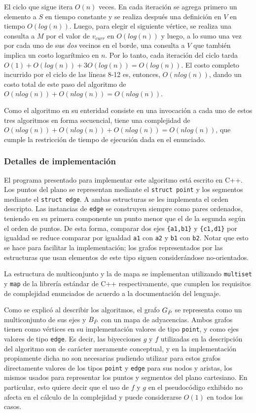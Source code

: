 El ciclo que sigue itera $O(n)$ veces. En cada iteración se agrega primero un elemento a $S$ en tiempo constante y se realiza después una definición en $V$ en tiempo $O(log(n))$. Luego, para elegir el siguiente vértice, se realiza una consulta a $M$ por el valor de $v_{\mathit{curr}}$ en $O(log(n))$ y luego, a lo sumo una vez por cada uno de sus \textit{dos} vecinos en el borde, una consulta a $V$ que también implica un costo logarítmico en $n$. Por lo tanto, cada iteración del ciclo tarda $O(1) + O(log(n)) + 3O(log(n)) = O(log(n))$. El costo completo incurrido por el ciclo de las líneas 8-12 es, entonces, $O(nlog(n))$, dando un costo total de este paso del algoritmo de $O(n log(n)) + O(n log(n)) = O(nlog(n))$.

\medskip

Como el algoritmo en su enteridad consiste en una invocación a cada uno de estos tres algoritmos en forma secuencial, tiene una complejidad de $O(n log(n)) + O(n log(n)) + O(n log(n)) = O(n log(n))$, que cumple la restricción de tiempo de ejecución dada en el enunciado.

\subsubsection{Detalles de implementación}

El programa presentado para implementar este algoritmo está escrito en C++. Los puntos del plano se representan mediante el \texttt{struct point} y los segmentos mediante el \texttt{struct edge}. A ambas estructuras se les implementa el orden descripto. Las instancias de \texttt{edge} se construyen siempre como pares ordenados, teniendo en su primera componente un punto menor que el de la segunda según el orden de puntos. De esta forma, comparar dos ejes \texttt{\{a1,b1\}} y \texttt{\{c1,d1\}} por igualdad se reduce comparar por igualdad \texttt{a1} con \texttt{a2} y \texttt{b1} con \texttt{b2}. Notar que esto se hace para facilitar la implementación; los grafos representados por las estructuras que usan elementos de este tipo siguen considerándose no-orientados.

La estructura de multiconjunto y la de mapa se implementan utilizando \texttt{multiset} y \texttt{map} de la librería estándar de C++ respectivamente, que cumplen los requisitos de complejidad enunciados de acuerdo a la documentación del lenguaje.

Como se explicó al describir los algoritmos, el grafo $G_{\bar{P}}$ se representa como un multiconjunto de sus ejes y $B_{\bar{P}}$ con un mapa de adyacencias. Ambos grafos tienen como vértices en su implementación valores de tipo \texttt{point}, y como ejes valores de tipo \texttt{edge}. Es decir, las biyecciones $g$ y $f$ utilizadas en la descripción del algoritmo son de carácter meramente conceptual, y en la implementación propiamente dicha no son necesarias pudiendo utilizar para estos grafos directamente valores de los tipos \texttt{point} y \texttt{edge} para sus nodos y aristas, los mismos usados para representar los puntos y segmentos del plano cartesiano. En particular, esto quiere decir que el uso de $f$ y $g$ en el pseudocódigo exhibido no afecta en el cálculo de la complejidad y puede considerarse $O(1)$ en todos los casos.

